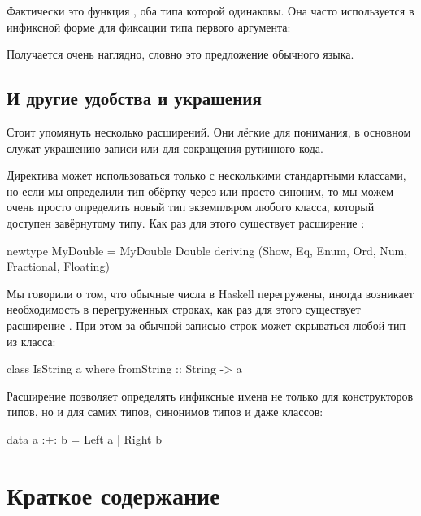 Фактически это функция , оба типа которой одинаковы.
Она часто используется в инфиксной форме для фиксации типа
первого аргумента:


Получается очень наглядно, словно это предложение обычного языка. 


\subsection{И другие удобства и украшения}

Стоит упомянуть несколько расширений. Они лёгкие для
понимания, в основном служат украшению записи или
для сокращения рутинного кода.

Директива  может использоваться только 
с несколькими стандартными классами, но если мы определили
тип-обёртку через  или просто синоним, 
то мы можем очень просто определить новый 
тип экземпляром любого класса, который доступен завёрнутому типу. 
Как раз для этого существует расширение 
:

\begin{code}
newtype MyDouble = MyDouble Double
    deriving (Show, Eq, Enum, Ord, Num, Fractional, Floating)
\end{code}

Мы говорили о том, что обычные числа в Haskell перегружены,
иногда возникает необходимость в перегруженных строках,
как раз для этого существует расширение .
При этом за обычной записью строк может скрываться любой тип
из класса:

\begin{code}
class IsString a where
    fromString :: String -> a
\end{code}

Расширение  позволяет определять
инфиксные имена не только для конструкторов типов,
но и для самих типов, синонимов типов и даже классов:

\begin{code}
data a :+: b = Left a | Right b
\end{code}

\section{Краткое содержание}

